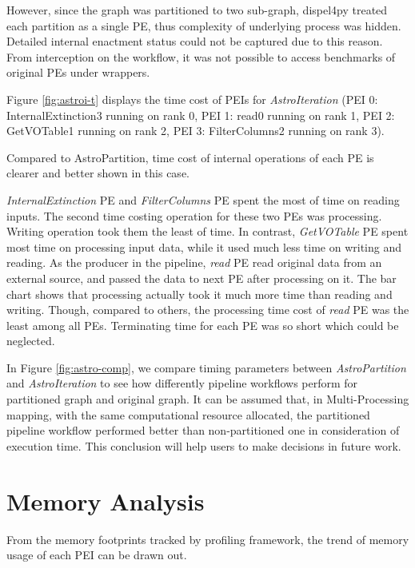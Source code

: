 \documentclass[10pt,twoside,openright,logo]{report}
\begin{document}
However, since the graph was partitioned to two sub-graph, dispel4py treated each partition as a single PE, thus complexity of underlying process was hidden. Detailed internal enactment status could not be captured due to this reason. From interception on the workflow, it was not possible to access benchmarks of original PEs under wrappers.

\figastropt

Figure \ref{fig:astroi-t} displays the time cost of PEIs for \textit{AstroIteration} (PEI 0: InternalExtinction3 running on rank 0, PEI 1: read0 running on rank 1, PEI 2: GetVOTable1 running on rank 2, PEI 3: FilterColumns2 running on rank 3).

Compared to {AstroPartition}, time cost of internal operations of each PE is clearer and better shown in this case.

\textit{InternalExtinction} PE and \textit{FilterColumns} PE spent the most of time on reading inputs. The second time costing operation for these two PEs was processing. Writing operation took them the least of time.
In contrast, \textit{GetVOTable} PE spent most time on processing input data, while it used much less time on writing and reading.
As the producer in the pipeline, \textit{read} PE read original data from an external source, and passed the data to next PE after processing on it. The bar chart shows that processing actually took it much more time than reading and writing. Though, compared to others, the processing time cost of \textit{read} PE was the least among all PEs. Terminating time for each PE was so short which could be neglected.

\figastroit

In Figure \ref{fig:astro-comp}, we compare timing parameters between \textit{AstroPartition} and \textit{AstroIteration} to see how differently pipeline workflows perform for partitioned graph and original graph.
It can be assumed that, in Multi-Processing mapping, with the same computational resource allocated, the partitioned pipeline workflow performed better than non-partitioned one in consideration of execution time. This conclusion will help users to make decisions in future work.

\figastrocomp

\section{Memory Analysis}
From the memory footprints tracked by profiling framework, the trend of memory usage of each PEI can be drawn out.
\end{document}
